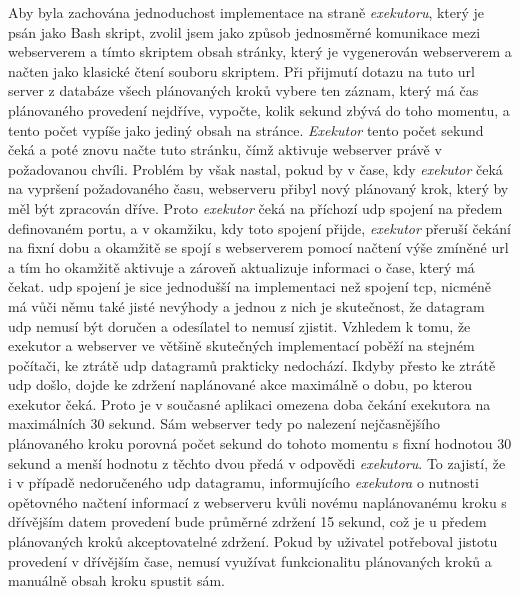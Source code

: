 Aby byla zachována jednoduchost implementace na straně \emph{exekutoru}, který je psán jako Bash skript, zvolil jsem jako způsob jednosměrné komunikace mezi webserverem a tímto skriptem obsah stránky, který je vygenerován webserverem a načten jako klasické čtení souboru skriptem. Při přijmutí dotazu na tuto \acrshort{url} server z databáze všech plánovaných kroků vybere ten záznam, který má čas plánovaného provedení nejdříve, vypočte, kolik sekund zbývá do toho momentu, a tento počet vypíše jako jediný obsah na stránce. \emph{Exekutor} tento počet sekund čeká a poté znovu načte tuto stránku, čímž aktivuje webserver právě v požadovanou chvíli. Problém by však nastal, pokud by v čase, kdy \emph{exekutor} čeká na vypršení požadovaného času, webserveru přibyl nový plánovaný krok, který by měl být zpracován dříve. Proto \emph{exekutor} čeká na příchozí \acrshort{udp} spojení na předem definovaném portu, a v okamžiku, kdy toto spojení přijde, \emph{exekutor} přeruší čekání na fixní dobu a okamžitě se spojí s webserverem pomocí načtení výše zmíněné \acrshort{url} a tím ho okamžitě aktivuje a zároveň aktualizuje informaci o čase, který má čekat. \acrshort{udp} spojení je sice jednodušší na implementaci než spojení \acrshort{tcp}, nicméně má vůči němu také jisté nevýhody a jednou z nich je skutečnost, že datagram \acrshort{udp} nemusí být doručen a odesílatel to nemusí zjistit. Vzhledem k tomu, že exekutor a webserver ve většině skutečných implementací poběží na stejném počítači, ke ztrátě \acrshort{udp} datagramů prakticky nedochází. Ikdyby přesto ke ztrátě \acrshort{udp} došlo, dojde ke zdržení naplánované akce maximálně o dobu, po kterou exekutor čeká. Proto je v současné aplikaci omezena doba čekání exekutora na maximálních 30 sekund. Sám webserver tedy po nalezení nejčasnějšího plánovaného kroku porovná počet sekund do tohoto momentu s fixní hodnotou 30 sekund a menší hodnotu z těchto dvou předá v odpovědi \emph{exekutoru}. To zajistí, že i v případě nedoručeného \acrshort{udp} datagramu, informujícího \emph{exekutora} o nutnosti opětovného načtení informací z webserveru kvůli novému naplánovanému kroku s dřívějším datem provedení bude průměrné zdržení 15 sekund, což je u předem plánovaných kroků akceptovatelné zdržení. Pokud by uživatel potřeboval jistotu provedení v dřívějším čase, nemusí využívat funkcionalitu plánovaných kroků a manuálně obsah kroku spustit sám.

